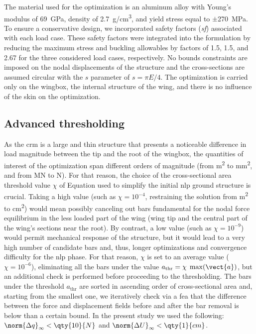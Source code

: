 The material used for the optimization is an aluminum alloy with Young's modulus of \qty{69}{\GPa}, density of \qty{2.7}{\gram/\cm^3}, and yield stress equal to $\pm$\qty{270}{\MPa}. To ensure a conservative design, we incorporated safety factors (\textit{sf}) associated with each load case. These safety factors were integrated into the formulation by reducing the maximum stress and buckling allowables by factors of 1.5, 1.5, and 2.67 for the three considered load cases, respectively. No bounds constraints are imposed on the nodal displacements of the structure and the cross-sections are assumed circular with the $s$ parameter of  $s = \pi E/4$. The optimization is carried only on the wingbox, the internal structure of the wing, and there is no influence of the skin on the optimization.

\subsection{Advanced thresholding}
As the \gls{crm} is a large and thin structure that presents a noticeable difference in load magnitude between the tip and the root of the wingbox, the quantities of interest of the optimization span different orders of magnitude (from \unit{m^2} to \unit{mm^2}, and from \unit{MN} to \unit{N}). For that reason, the choice of the cross-sectional area threshold value $\chi$ of Equation  used to simplify the initial \gls{nlp} ground structure is crucial. Taking a high value (such as $\chi = 10^{-4}$, restraining the solution from \unit{m^2} to \unit{cm^2}) would mean possibly canceling out bars fundamental for the nodal force equilibrium in the less loaded part of the wing (wing tip and the central part of the wing's sections near the root). By contrast, a low value (such as $\chi=10^{-9}$) would permit  mechanical response of the structure, but it would lead to a very high number of candidate bars and, thus, longer optimizations and convergence difficulty for the \gls{nlp} phase. For that reason, $\chi$ is set to an average value ($\chi=10^{-6}$), eliminating all the bars under the value $a_{\text{thr}}=\chi \; \max(\vect{a})$, but an additional check is performed before proceeding to the thresholding. The bars under the threshold $a_{\text{thr}}$ are sorted in ascending order of cross-sectional area and, starting from the smallest one, we iteratively check via a \gls{fea} that the difference between the force and displacement fields before and after the bar removal is below than a certain bound. In the present study we used the following: $\norm{\Delta q}_{\infty}<\qty{10}{N}$ and $\norm{\Delta U}_{\infty}<\qty{1}{cm}$.

